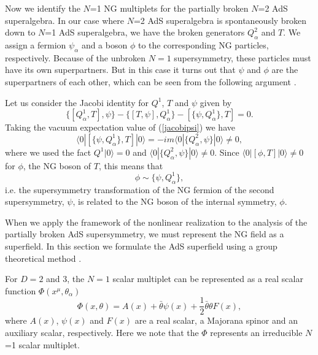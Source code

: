 \documentclass[a4paper,12pt]{article}
\def\btheta{\bar{\theta}}
\begin{document}
Now we identify the $N$=1 NG multiplets for the 
partially broken $N$=2 AdS superalgebra.
In our case where $N$=2 AdS superalgebra is spontaneously broken 
down to $N$=1 AdS superalgebra, we have the broken generators
 $Q^{2}_{\alpha}$ and $T$. 
We assign a fermion $\psi_{\alpha}$ and a boson $\phi$ 
to the corresponding NG particles, respectively.
Because of the unbroken $N=1$ supersymmetry, these particles
must have its own superpartners. 
But in this case 
it turns out that $\psi$ and $\phi$ 
are the superpartners of each other, which can be seen from
the following argument \cite{KU,GU}.

Let us consider the Jacobi identity for $Q^{1}$, $T$ and $\psi$ given
by 
\begin{equation}
 \{[Q^{1}_{\alpha},T], \psi\} - \{[T, \psi], Q^{1}_{\alpha}\}
  -[\{\psi, Q^{1}_{\alpha}\}, T] = 0.
	\label{jacobipsi}
\end{equation}
Taking the vacuum expectation value of (\ref{jacobipsi}) we have
\begin{equation}
 \langle 0|[ \{\psi, Q^{1}_{\alpha}\}, T]|0\rangle =
  -im\langle 0| \{Q^{2}_{\alpha}, \psi\}|0\rangle \neq 0,
\end{equation}
where we used the fact $Q^{1}|0\rangle = 0$ and
 $\langle 0| \{Q^{2}_{\alpha}, \psi\}|0\rangle \neq 0$.
Since $\langle 0|[\phi, T]|0\rangle \neq 0$ for $\phi$, the NG boson 
of $T$, this means that
\begin{equation}
 \phi \sim \{\psi, Q^{1}_{\alpha}\},
\end{equation}
i.e. the supersymmetry transformation of the NG fermion of the second
supersymmetry, $\psi$, is related to the NG boson of the
internal symmetry, $\phi$.

\vspace{0.3cm}
\vspace{0.3cm}

When we apply the framework of the nonlinear realization \cite{CWZOg} to the
analysis of the partially broken AdS supersymmetry, we must
represent the NG field as a superfield. In this section we
formulate the AdS superfield using a group theoretical method \cite{IS}.

For $D=2$ and $3$, the $N=1$ scalar multiplet
can be represented as a real scalar function $\Phi(x^{\mu},\theta_{\alpha})$ 
\begin{equation}
 \Phi(x,\theta) = A(x) + \btheta\psi(x) + \frac{1}{2}\btheta\theta F(x),
  \label{2dflatphi}
\end{equation}
where $A(x)$, $\psi(x)$ and $F(x)$ 
are a real scalar, a Majorana
spinor and an auxiliary scalar, respectively.
Here we note that the $\Phi$ represents an irreducible $N$=1 scalar multiplet.
\end{document}
